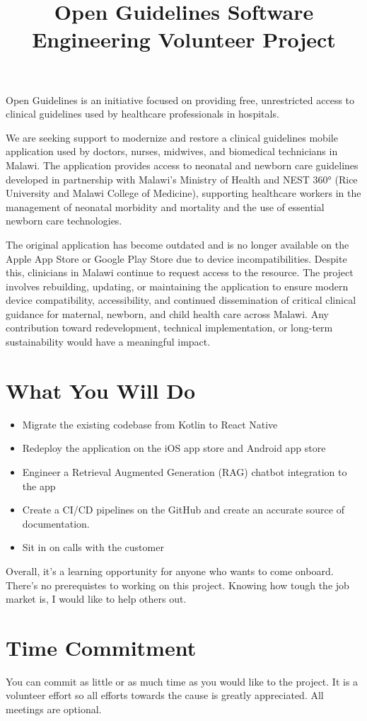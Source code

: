 \documentclass[10pt]{amsart}
\begin{document}
\setdefaultleftmargin{0em}{3em}{}{}{}{}


\title{Open Guidelines Software Engineering Volunteer Project}
\maketitle
\thispagestyle{empty}
Open Guidelines is an initiative focused on providing free, unrestricted access to clinical guidelines used by healthcare professionals in hospitals.

We are seeking support to modernize and restore a clinical guidelines mobile application used by doctors, nurses, midwives, and biomedical technicians in Malawi. The application provides access to neonatal and newborn care guidelines developed in partnership with Malawi’s Ministry of Health and NEST 360° (Rice University and Malawi College of Medicine), supporting healthcare workers in the management of neonatal morbidity and mortality and the use of essential newborn care technologies.

The original application has become outdated and is no longer available on the Apple App Store or Google Play Store due to device incompatibilities. Despite this, clinicians in Malawi continue to request access to the resource. The project involves rebuilding, updating, or maintaining the application to ensure modern device compatibility, accessibility, and continued dissemination of critical clinical guidance for maternal, newborn, and child health care across Malawi. Any contribution toward redevelopment, technical implementation, or long-term sustainability would have a meaningful impact.

\section{What You Will Do}
\begin{itemize}
\item Migrate the existing codebase from Kotlin to React Native
\item Redeploy the application on the iOS app store and Android app store
\item Engineer a Retrieval Augmented Generation (RAG) chatbot integration to the app
\item Create a CI/CD pipelines on the GitHub and create an accurate source of documentation.
\item Sit in on calls with the customer 
\end{itemize}

Overall, it's a learning opportunity for anyone who wants to come onboard. There's no prerequistes to working on this project. Knowing how tough the job market is, I would like to help others out.

\section{Time Commitment}
You can commit as little or as much time as you would like to the project. It is a volunteer effort so all efforts towards the cause is greatly appreciated. All meetings are optional.
\end{document}
